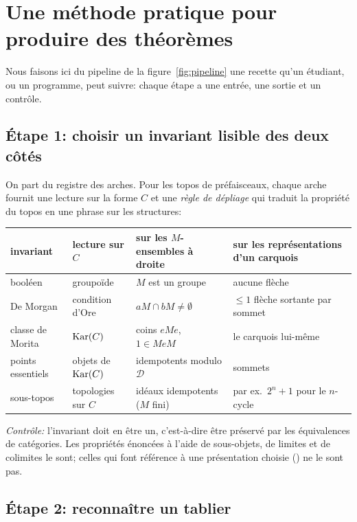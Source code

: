\section{Une méthode pratique pour produire des théorèmes}\label{sec:method}

Nous faisons ici du pipeline de la figure~\ref{fig:pipeline} une recette qu'un étudiant, ou un programme, peut suivre: chaque étape a une entrée, une sortie et un contrôle.

\subsection{Étape 1: choisir un invariant lisible des deux côtés}

On part du registre des arches. Pour les topos de préfaisceaux, chaque arche fournit une lecture sur la forme $C$ et une \emph{règle de dépliage} qui traduit la propriété du topos en une phrase sur les structures:

\begin{center}\small
\begin{tabularx}{\linewidth}{>{\raggedright\arraybackslash}p{2.6cm}>{\raggedright\arraybackslash}p{3.2cm}>{\raggedright\arraybackslash}X>{\raggedright\arraybackslash}X}
\toprule
invariant & lecture sur $C$ & sur les $M$-ensembles à droite & sur les représentations d'un carquois\\
\midrule
booléen & groupoïde & $M$ est un groupe & aucune flèche\\
De Morgan & condition d'Ore & $aM\cap bM\neq\emptyset$ & $\le 1$ flèche sortante par sommet\\
classe de Morita & $\operatorname{Kar}(C)$ & coins $eMe$, $1\in MeM$ & le carquois lui-même\\
points essentiels & objets de $\operatorname{Kar}(C)$ & idempotents modulo $\mathcal D$ & sommets\\
sous-topos & topologies sur $C$ & idéaux idempotents ($M$ fini) & par ex.\ $2^n+1$ pour le $n$-cycle\\
\bottomrule
\end{tabularx}
\end{center}

\emph{Contrôle:} l'invariant doit en être un, c'est-à-dire être préservé par les équivalences de catégories. Les propriétés énoncées à l'aide de sous-objets, de limites et de colimites le sont; celles qui font référence à une présentation choisie () ne le sont pas.

\subsection{Étape 2: reconnaître un tablier}

